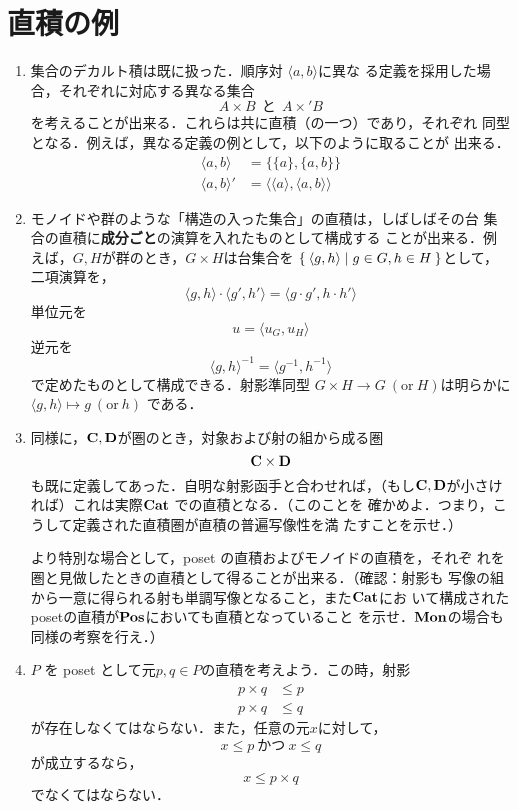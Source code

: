 \section{直積の例}
\label{直積の例}
\begin{enumerate}
 \item 集合のデカルト積は既に扱った．順序対 $\langle a,b \rangle$に異な
       る定義を採用した場合，それぞれに対応する異なる集合
       \[
	A \times B\ \ \text{と}\ \  A \times ' B
       \]
       を考えることが出来る．これらは共に直積（の一つ）であり，それぞれ
       同型となる．例えば，異なる定義の例として，以下のように取ることが
       出来る．
       \begin{align*}
	\langle a, b\rangle &= \{\{a\}, \{a, b\}\}\\
	\langle a, b\rangle ' &= \langle \langle a\rangle, \langle a, b\rangle\rangle
       \end{align*}
       
 \item モノイドや群のような「構造の入った集合」の直積は，しばしばその台
       集合の直積に{\bfseries 成分ごと}の演算を入れたものとして構成する
       ことが出来る．例えば，$G, H$が群のとき，$G\times H$は台集合を
       $\Set{\langle g, h\rangle | g \in G, h \in H}$として，二項演算を，
       \[
	\langle g, h \rangle \cdot \langle g', h'\rangle
         = \langle g \cdot g', h \cdot h' \rangle
       \]
       単位元を
       \[
	u = \langle u_G, u_H \rangle
       \]
       逆元を
       \[
	\langle g, h \rangle^{-1} = \langle g^{-1}, h^{-1} \rangle
       \]
       で定めたものとして構成できる．射影準同型
       $G \times H \to G\ (\text{or}\ H)$は明らかに
       $\langle g, h\rangle \mapsto g\ (\text{or}\ h)$ である．
 \item 同様に，${\bf C}, {\bf D}$が圏のとき，対象および射の組から成る圏
       \[
	{\bf C} \times {\bf D}
       \]
       も既に定義してあった．自明な射影函手と合わせれば，（もし${\bf C},
       {\bf D}$が小さければ）これは実際$\mathbf{Cat}$ での直積となる．（このことを
       確かめよ．つまり，こうして定義された直積圏が直積の普遍写像性を満
       たすことを示せ．）

       より特別な場合として，poset の直積およびモノイドの直積を，それぞ
       れを圏と見做したときの直積として得ることが出来る．（確認：射影も
       写像の組から一意に得られる射も単調写像となること，また$\mathbf{Cat}$にお
       いて構成されたposetの直積が$\mathbf{Pos}$においても直積となっていること
       を示せ．$\mathbf{Mon}$の場合も同様の考察を行え．）
 \item $P$ を poset として元$p, q \in P$の直積を考えよう．この時，射影
       \begin{align*}
	p \times q &\leq p\\
	p \times q &\leq q
       \end{align*}
       が存在しなくてはならない．また，任意の元$x$に対して，
       \[
	x \leq p\ \text{かつ}\ x \leq q
       \]
       が成立するなら，
       \[
	x \leq p \times q
       \]
       でなくてはならない．


\end{enumerate}
